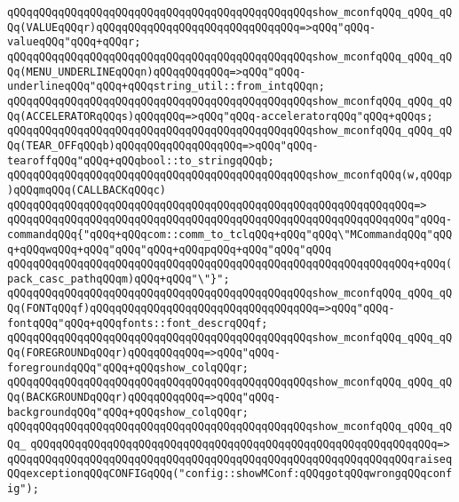 \verb|qQQqqQQqqQQqqQQqqQQqqQQqqQQqqQQqqQQqqQQqqQQqqQQqshow_mconfqQQq_qQQq_qQQq(VALUEqQQqr)qQQqqQQqqQQqqQQqqQQqqQQqqQQqqQQq=>qQQq"qQQq-valueqQQq"qQQq+qQQqr;|\newline
\verb|qQQqqQQqqQQqqQQqqQQqqQQqqQQqqQQqqQQqqQQqqQQqqQQqshow_mconfqQQq_qQQq_qQQq(MENU_UNDERLINEqQQqn)qQQqqQQqqQQq=>qQQq"qQQq-underlineqQQq"qQQq+qQQqstring_util::from_intqQQqn;|\newline
\verb|qQQqqQQqqQQqqQQqqQQqqQQqqQQqqQQqqQQqqQQqqQQqqQQqshow_mconfqQQq_qQQq_qQQq(ACCELERATORqQQqs)qQQqqQQq=>qQQq"qQQq-acceleratorqQQq"qQQq+qQQqs;|\newline
\verb|qQQqqQQqqQQqqQQqqQQqqQQqqQQqqQQqqQQqqQQqqQQqqQQqshow_mconfqQQq_qQQq_qQQq(TEAR_OFFqQQqb)qQQqqQQqqQQqqQQqqQQq=>qQQq"qQQq-tearoffqQQq"qQQq+qQQqbool::to_stringqQQqb;|\newline
\newline
\verb|qQQqqQQqqQQqqQQqqQQqqQQqqQQqqQQqqQQqqQQqqQQqqQQqshow_mconfqQQq(w,qQQqp)qQQqmqQQq(CALLBACKqQQqc)|\newline
\verb|qQQqqQQqqQQqqQQqqQQqqQQqqQQqqQQqqQQqqQQqqQQqqQQqqQQqqQQqqQQqqQQq=>|\newline
\verb|qQQqqQQqqQQqqQQqqQQqqQQqqQQqqQQqqQQqqQQqqQQqqQQqqQQqqQQqqQQqqQQq"qQQq-commandqQQq{"qQQq+qQQqcom::comm_to_tclqQQq+qQQq"qQQq\"MCommandqQQq"qQQq+qQQqwqQQq+qQQq"qQQq"qQQq+qQQqpqQQq+qQQq"qQQq"qQQq|\newline
\verb|qQQqqQQqqQQqqQQqqQQqqQQqqQQqqQQqqQQqqQQqqQQqqQQqqQQqqQQqqQQqqQQq+qQQq(pack_casc_pathqQQqm)qQQq+qQQq"\"}";|\newline
\newline
\verb|qQQqqQQqqQQqqQQqqQQqqQQqqQQqqQQqqQQqqQQqqQQqqQQqshow_mconfqQQq_qQQq_qQQq(FONTqQQqf)qQQqqQQqqQQqqQQqqQQqqQQqqQQqqQQqqQQq=>qQQq"qQQq-fontqQQq"qQQq+qQQqfonts::font_descrqQQqf;|\newline
\verb|qQQqqQQqqQQqqQQqqQQqqQQqqQQqqQQqqQQqqQQqqQQqqQQqshow_mconfqQQq_qQQq_qQQq(FOREGROUNDqQQqr)qQQqqQQqqQQq=>qQQq"qQQq-foregroundqQQq"qQQq+qQQqshow_colqQQqr;|\newline
\verb|qQQqqQQqqQQqqQQqqQQqqQQqqQQqqQQqqQQqqQQqqQQqqQQqshow_mconfqQQq_qQQq_qQQq(BACKGROUNDqQQqr)qQQqqQQqqQQq=>qQQq"qQQq-backgroundqQQq"qQQq+qQQqshow_colqQQqr;|\newline
\newline
\verb|qQQqqQQqqQQqqQQqqQQqqQQqqQQqqQQqqQQqqQQqqQQqqQQqshow_mconfqQQq_qQQq_qQQq_|\newline
\verb|qQQqqQQqqQQqqQQqqQQqqQQqqQQqqQQqqQQqqQQqqQQqqQQqqQQqqQQqqQQqqQQq=>|\newline
\verb|qQQqqQQqqQQqqQQqqQQqqQQqqQQqqQQqqQQqqQQqqQQqqQQqqQQqqQQqqQQqqQQqraiseqQQqexceptionqQQqCONFIGqQQq("config::showMConf:qQQqgotqQQqwrongqQQqconfig");|\newline
